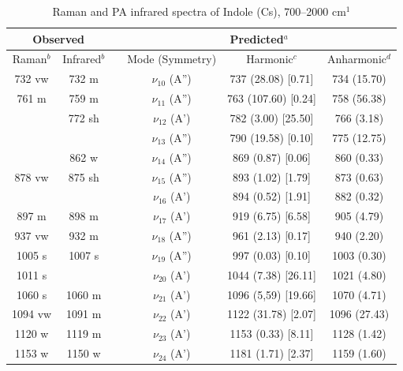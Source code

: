 	
	
	
		\begin{table}[H]
			\caption{Raman and PA infrared spectra of Indole (Cs), 700–2000 cm$^{1}$}
			\begin{center}
			\begin{tabular}{c c c c c c}
				\hline
				\multicolumn{ 2}{c}{Observed} & \multicolumn{1}{c}{} & \multicolumn{ 3}{c}{Predicted$^{a}$} \\ \hline
				Raman$^{b}$ & \multicolumn{1}{c}{Infrared$^{b}$} &  & \multicolumn{1}{c}{Mode (Symmetry)} & \multicolumn{1}{c}{Harmonic$^{c}$} & Anharmonic$^{d}$ \\ \hline
	732 vw & 732 m  &  & $\nu_{10}$ (A”) & 737 (28.08) [0.71] & 734 (15.70) \\ 
	761 m & 759 m &  & $\nu_{11}$ (A”) & 763 (107.60) [0.24] & 758 (56.38) \\ 
	& 772 sh &  & $\nu_{12}$ (A’) & 782 (3.00) [25.50] & 766 (3.18) \\ 
	&  &  & $\nu_{13}$ (A”) & 790 (19.58) [0.10] & 775 (12.75) \\ 
	& 862 w &  & $\nu_{14}$ (A”) & 869 (0.87) [0.06] & 860 (0.33) \\ 
	878 vw & 875 sh &  & $\nu_{15}$ (A”) & 893 (1.02) [1.79] & 873 (0.63) \\
	&  &  & $\nu_{16}$ (A’) & 894 (0.52) [1.91] & 882 (0.32) \\
	897 m & 898 m &  & $\nu_{17}$ (A’) & 919 (6.75) [6.58] & 905 (4.79) \\
	937 vw & 932 m &  & $\nu_{18}$ (A”) & 961 (2.13) [0.17] & 940 (2.20) \\ 
	1005 s & 1007 s &  & $\nu_{19}$ (A”) & 997 (0.03) [0.10] & 1003 (0.30) \\ 
	1011 s &  &  & $\nu_{20}$ (A’) & 1044 (7.38) [26.11] & 1021 (4.80) \\
	1060 s & 1060 m &  & $\nu_{21}$ (A’)& 1096 (5,59) [19.66] & 1070 (4.71)\\ 
	1094 vw & 1091 m &  & $\nu_{22}$ (A’)& 1122 (31.78) [2.07]	& 1096 (27.43)\\ 
	1120 w & 1119 m &  &$\nu_{23}$ (A’) & 1153 (0.33) [8.11] & 1128 (1.42) \\
	1153 w & 1150 w &  & $\nu_{24}$ (A’)& 1181 (1.71) [2.37]& 1159 (1.60)\\
	 \hline
\end{tabular}
\end{center}
\end{table}
	

